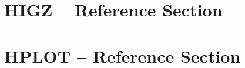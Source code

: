 

\setcounter{page}{1}
\part{HIGZ -- Reference Section}
\part{HPLOT -- Reference Section}


\begin{appendix}
\end{appendix}

\newpage

